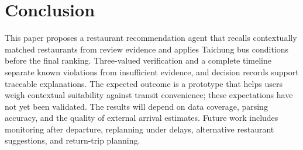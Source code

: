 \documentclass[conference]{IEEEtran}
\begin{document}
\section{Conclusion}\label{sec:conclusion}
This paper proposes a restaurant recommendation agent that recalls contextually matched restaurants from review evidence and applies Taichung bus conditions before the final ranking. Three-valued verification and a complete timeline separate known violations from insufficient evidence, and decision records support traceable explanations. The expected outcome is a prototype that helps users weigh contextual suitability against transit convenience; these expectations have not yet been validated. The results will depend on data coverage, parsing accuracy, and the quality of external arrival estimates. Future work includes monitoring after departure, replanning under delays, alternative restaurant suggestions, and return-trip planning.




\end{document}
